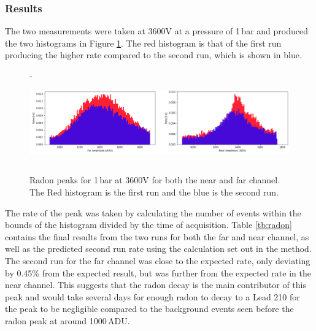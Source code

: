 \documentclass[a4paper]{article}
\begin{document}
\subsubsection{Results}
The two measurements were taken at 3600V at a pressure of 1\,bar and produced the two histograms in Figure \ref{fig:radon}. The red histogram is that of the first run producing the higher rate compared to the second run, which is shown in blue. 
\begin{figure}[H]-
    \centering
    \includegraphics[height=3.5cm]{radon.png}
    \caption{Radon peaks for 1\,bar at 3600V for both the near and far channel. The Red histogram is the first run and the blue is the second run.}
    \label{fig:radon}
\end{figure}
\noindent The rate of the peak was taken by calculating the number of events within the bounds of the histogram divided by the time of acquisition. Table \ref{tb:radon} contains the final results from the two runs for both the far and near channel, as well as the predicted second run rate using the calculation set out in the method. The second run for the far channel was close to the expected rate, only deviating by 0.45\% from the expected result, but was further from the expected rate in the near channel. This suggests that the radon decay is the main contributor of this peak and would take several days for enough radon to decay to a Lead 210 for the peak to be negligible compared to the background events seen before the radon peak at around 1000\,ADU.
\end{document}
